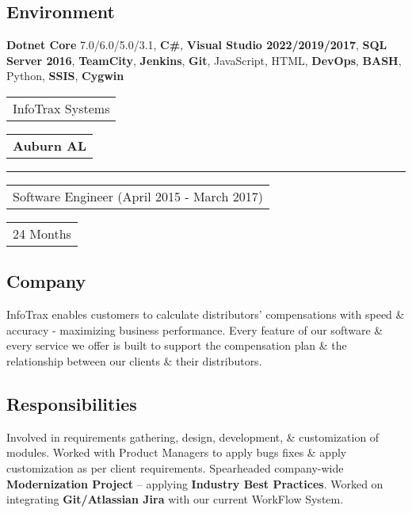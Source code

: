\documentclass[letterpaper,11pt]{article}
\begin{document}
    \subsection{Environment}
    \textbf{\color{darkgray}Dotnet Core} 7.0/6.0/5.0/3.1, \textbf{\color{darkgray}C\#}, \textbf{\color{darkgray}Visual Studio 2022/2019/2017}, \textbf{\color{darkgray}SQL Server 2016}, \textbf{\color{darkgray}TeamCity}, \textbf{\color{darkgray}Jenkins}, \textbf{\color{darkgray}Git}, JavaScript, HTML, \textbf{\color{darkgray}DevOps}, \textbf{\color{darkgray}BASH}, Python, \textbf{\color{darkgray}SSIS}, \textbf{\color{darkgray}Cygwin}

    \pagebreak


    \vspace{1.27cm}
    \noindent
    \begin{tabular}[t]{@{}l}
    \Large{InfoTrax Systems}
    \end{tabular}
    \hfill
    \begin{tabular}[t]{l@{}}
    \textbf{\color{darkgray}Auburn AL}
    \end{tabular}
    \noindent\rule{\textwidth}{0.5pt}
    \begin{tabular}[t]{@{}l}
    Software Engineer (April 2015 - March 2017)
    \end{tabular}
    \hfill
    \begin{tabular}[t]{l@{}}
    24 Months
    \end{tabular}

    \subsection{Company}
    InfoTrax enables customers to calculate distributors’ compensations with speed \& accuracy - maximizing business performance. Every feature of our software \& every service we offer is built to support the compensation plan \& the relationship between our clients \& their distributors.

    \subsection{Responsibilities}
    Involved in requirements gathering, design, development, \& customization of modules. Worked with Product Managers to apply bugs fixes \& apply customization as per client requirements. Spearheaded company-wide \textbf{\color{darkgray}Modernization Project} – applying \textbf{\color{darkgray}Industry Best Practices}. Worked on integrating \textbf{\color{darkgray}Git/Atlassian Jira} with our current WorkFlow System.
\end{document}
